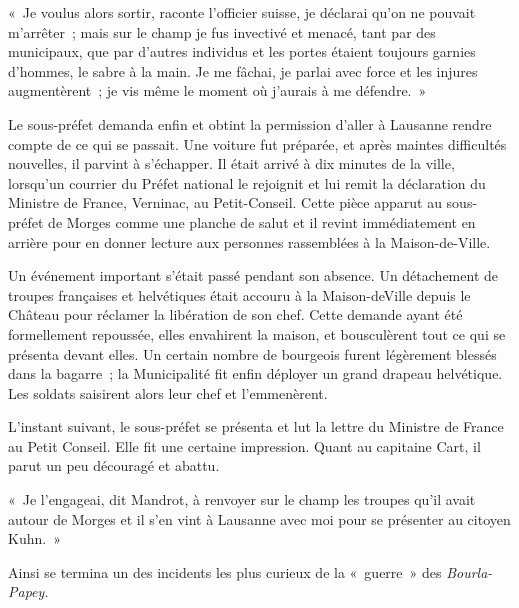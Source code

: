 \documentclass[french,twoside]{book} %
\newenvironment{quoteblock}%
  {\begin{quoting}}
  {\end{quoting}}
\newenvironment{quotebar}{%
    \def\FrameCommand{{\color{rubric!10!}\vrule width 0.5em} \hspace{0.9em}}%
    \def\OuterFrameSep{\itemsep} %
    \MakeFramed {\advance\hsize-\width \FrameRestore}
  }%
  {%
    \endMakeFramed
  }
\renewenvironment{quoteblock}%
  {%
    \savenotes
    \setstretch{0.9}
    \normalfont
    \begin{quotebar}
  }
  {%
    \end{quotebar}
    \spewnotes
  }
\begin{document}
\begin{quoteblock}
 \noindent « Je voulus alors sortir, raconte l’officier suisse, je déclarai qu’on ne pouvait m’arrêter ; mais sur le champ je fus invectivé et menacé, tant par des municipaux, que par d’autres individus et les portes étaient toujours garnies d’hommes, le sabre à la main. Je me fâchai, je parlai avec force et les injures augmentèrent ; je vis même le moment où j’aurais à me défendre. »
 \end{quoteblock}

\noindent Le sous-préfet demanda enfin et obtint la permission d’aller à Lausanne rendre compte de ce qui se passait. Une voiture fut préparée, et après maintes difficultés nouvelles, il parvint à s’échapper. Il était arrivé à dix minutes de la ville, lorsqu’un courrier du Préfet national le rejoignit et lui remit la déclaration du Ministre de France, Verninac, au Petit-Conseil. Cette pièce apparut au sous-préfet de Morges comme une planche de salut et il revint immédiatement en arrière pour en donner lecture aux personnes rassemblées à la Maison-de-Ville.\par
Un événement important s’était passé pendant son absence. Un détachement de troupes françaises et helvétiques était accouru à la Maison-deVille depuis le Château pour réclamer la libération de son chef. Cette demande ayant été formellement repoussée, elles envahirent la maison, et bousculèrent tout ce qui se présenta devant elles. Un certain nombre de bourgeois furent légèrement blessés dans la bagarre ; la Municipalité fit enfin déployer un grand drapeau helvétique. Les soldats saisirent alors leur chef et l’emmenèrent.\par
L’instant suivant, le sous-préfet se présenta et lut la lettre du Ministre de France au Petit Conseil. Elle fit une certaine impression. Quant au capitaine Cart, il parut un peu découragé et abattu.\par

\begin{quoteblock}
 \noindent « Je l’engageai, dit Mandrot, à renvoyer sur le champ les troupes qu’il avait autour de Morges et il s’en vint à Lausanne avec moi pour se présenter au citoyen Kuhn. »
 \end{quoteblock}

\noindent Ainsi se termina un des incidents les plus curieux de la « guerre » des \emph{Bourla-Papey.}
\end{document}

